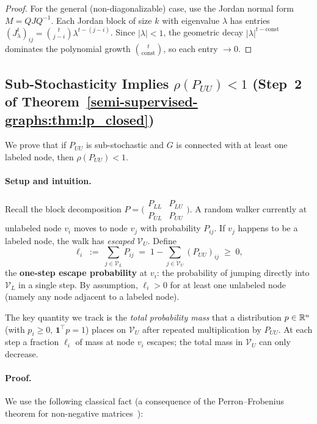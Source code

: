 \begin{notechapter}
\begin{proof}
For the general (non-diagonalizable) case, use the Jordan normal form
$M = QJQ^{-1}$. Each Jordan block of size $k$ with eigenvalue $\lambda$ has
entries $(J_\lambda^t)_{ij} = \binom{t}{j-i}\lambda^{t-(j-i)}$. Since
$|\lambda| < 1$, the geometric decay $|\lambda|^{t-\text{const}}$ dominates
the polynomial growth $\binom{t}{\text{const}}$, so each entry $\to 0$.
\end{proof}

\subsection{Sub-Stochasticity Implies $\rho(P_{UU})<1$ (Step~2 of
  Theorem~\ref{semi-supervised-graphs:thm:lp_closed})}
\label{semi-supervised-graphs:app:substochastic}

We prove that if $P_{UU}$ is sub-stochastic and $G$ is connected with at least
one labeled node, then $\rho(P_{UU}) < 1$.

\paragraph{Setup and intuition.}
Recall the block decomposition $P = \bigl(\begin{smallmatrix}P_{LL}&P_{LU}\\
P_{UL}&P_{UU}\end{smallmatrix}\bigr)$.  A random walker currently at unlabeled
node $v_i$ moves to node $v_j$ with probability $P_{ij}$.  If $v_j$ happens to
be a labeled node, the walk has \emph{escaped} $\mathcal{V}_U$.  Define
\[
  \ell_i \;:=\; \sum_{j \in \mathcal{V}_L} P_{ij}
  \;=\; 1 - \sum_{j \in \mathcal{V}_U}(P_{UU})_{ij} \;\geq\; 0,
\]
the \textbf{one-step escape probability} at $v_i$: the probability of jumping
directly into $\mathcal{V}_L$ in a single step.  By assumption, $\ell_i > 0$
for at least one unlabeled node (namely any node adjacent to a labeled node).

The key quantity we track is the \emph{total probability mass} that a
distribution $p \in \mathbb{R}^u$ (with $p_i \geq 0$, $\mathbf{1}^\top p = 1$) places
on $\mathcal{V}_U$ after repeated multiplication by $P_{UU}$.  At each step a
fraction $\ell_i$ of mass at node $v_i$ escapes; the total mass in
$\mathcal{V}_U$ can only decrease.

\paragraph{Proof.}
We use the following classical fact (a consequence of the Perron--Frobenius
theorem for non-negative matrices~\cite{semi-supervised-graphs:chung1997}):


\end{notechapter}
